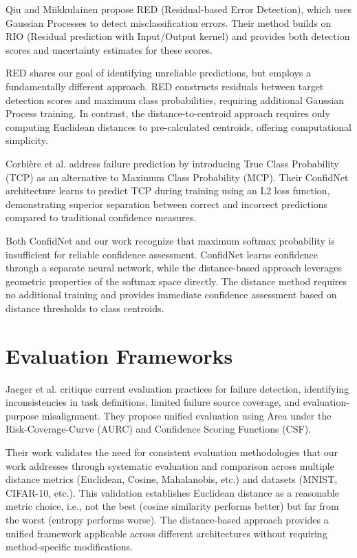 Qiu and Miikkulainen \cite{QiuMiikkulainen2022} propose RED (Residual-based Error Detection), which uses Gaussian Processes to detect misclassification errors. Their method builds on RIO (Residual prediction with Input/Output kernel) and provides both detection scores and uncertainty estimates for these scores.

RED shares our goal of identifying unreliable predictions, but employs a fundamentally different approach. RED constructs residuals between target detection scores and maximum class probabilities, requiring additional Gaussian Process training. In contrast, the distance-to-centroid approach requires only computing Euclidean distances to pre-calculated centroids, offering computational simplicity.

Corbière et al. \cite{Corbiere2019} address failure prediction by introducing True Class Probability (TCP) as an alternative to Maximum Class Probability (MCP). Their ConfidNet architecture learns to predict TCP during training using an L2 loss function, demonstrating superior separation between correct and incorrect predictions compared to traditional confidence measures.

Both ConfidNet and our work recognize that maximum softmax probability is insufficient for reliable confidence assessment. ConfidNet learns confidence through a separate neural network, while the distance-based approach leverages geometric properties of the softmax space directly. The distance method requires no additional training and provides immediate confidence assessment based on distance thresholds to class centroids.

\section{Evaluation Frameworks}

Jaeger et al. \cite{Jaeger2022} critique current evaluation practices for failure detection, identifying inconsistencies in task definitions, limited failure source coverage, and evaluation-purpose misalignment. They propose unified evaluation using Area under the Risk-Coverage-Curve (AURC) and Confidence Scoring Functions (CSF).

Their work validates the need for consistent evaluation methodologies that our work addresses through systematic evaluation and comparison across multiple distance metrics (Euclidean, Cosine, Mahalanobis, etc.) and datasets (MNIST, CIFAR-10, etc.). This validation establishes Euclidean distance as a reasonable metric choice, i.e., not the best (cosine similarity performs better) but far from the worst (entropy performs worse). The distance-based approach provides a unified framework applicable across different architectures without requiring method-specific modifications.

